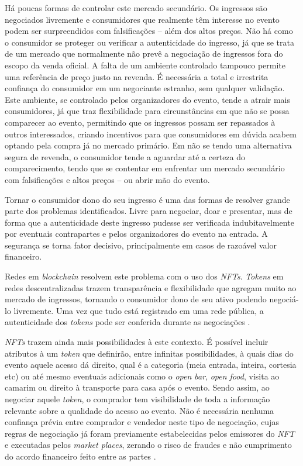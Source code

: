 Há poucas formas de controlar este mercado secundário. Os ingressos são negociados livremente e consumidores que realmente têm interesse no evento podem ser surpreendidos com falsificações -- além dos altos preços. Não há como o consumidor se proteger ou verificar a autenticidade do ingresso, já que se trata de um mercado que normalmente não prevê a negociação de ingressos fora do escopo da venda oficial. A falta de um ambiente controlado tampouco permite uma referência de preço justo na revenda. É necessária a total e irrestrita confiança do consumidor em um negociante estranho, sem qualquer validação. Este ambiente, se controlado pelos organizadores do evento, tende a atrair mais consumidores, já que traz flexibilidade para circunstâncias em que não se possa comparecer ao evento, permitindo que os ingressos possam ser repassados à outros interessados, criando incentivos para que consumidores em dúvida acabem optando pela compra já no mercado primário. Em não se tendo uma alternativa segura de revenda, o consumidor tende a aguardar até a certeza do comparecimento, tendo que se contentar em enfrentar um mercado secundário com falsificações e altos preços -- ou abrir mão do evento.

Tornar o consumidor dono do seu ingresso é uma das formas de resolver grande parte dos problemas identificados. Livre para negociar, doar e presentar, mas de forma que a autenticidade deste ingresso pudesse ser verificada indubitavelmente por eventuais contrapartes e pelos organizadores do evento na entrada. A segurança se torna fator decisivo, principalmente em casos de razoável valor financeiro.

Redes em \textit{blockchain} resolvem este problema com o uso dos \textit{NFTs}. \textit{Tokens} em redes descentralizadas trazem transparência e flexibilidade que agregam muito ao mercado de ingressos, tornando o consumidor dono de seu ativo podendo negociá-lo livremente. Uma vez que tudo está registrado em uma rede pública, a autenticidade dos \textit{tokens} pode ser conferida durante as negociações \cite{liu2021hybrid}.

\textit{NFTs} trazem ainda mais possibilidades à este contexto. É possível incluir atributos à um \textit{token} que definirão, entre infinitas possibilidades, à quais dias do evento aquele acesso dá direito, qual é a categoria (meia entrada, inteira, cortesia etc) ou até mesmo eventuais adicionais como o \textit{open bar}, \textit{open food}, visita ao camarim ou direito à transporte para casa após o evento. Sendo assim, ao negociar aquele \textit{token}, o comprador tem visibilidade de toda a informação relevante sobre a qualidade do acesso ao evento. Não é necessária nenhuma confiança prévia entre comprador e vendedor neste tipo de negociação, cujas regras de negociação já foram previamente estabelecidas pelos emissores do \textit{NFT} e executadas pelos \textit{market places}, zerando o risco de fraudes e não cumprimento do acordo financeiro feito entre as partes \cite{liu2021hybrid}.

